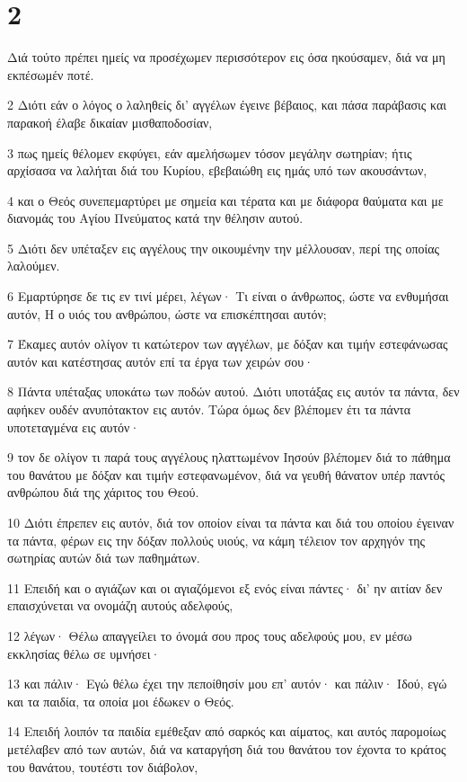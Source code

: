\chapter{2}

\par Διά τούτο πρέπει ημείς να προσέχωμεν περισσότερον εις όσα ηκούσαμεν, διά να μη εκπέσωμέν ποτέ.
\par 2 Διότι εάν ο λόγος ο λαληθείς δι' αγγέλων έγεινε βέβαιος, και πάσα παράβασις και παρακοή έλαβε δικαίαν μισθαποδοσίαν,
\par 3 πως ημείς θέλομεν εκφύγει, εάν αμελήσωμεν τόσον μεγάλην σωτηρίαν; ήτις αρχίσασα να λαλήται διά του Κυρίου, εβεβαιώθη εις ημάς υπό των ακουσάντων,
\par 4 και ο Θεός συνεπεμαρτύρει με σημεία και τέρατα και με διάφορα θαύματα και με διανομάς του Αγίου Πνεύματος κατά την θέλησιν αυτού.
\par 5 Διότι δεν υπέταξεν εις αγγέλους την οικουμένην την μέλλουσαν, περί της οποίας λαλούμεν.
\par 6 Εμαρτύρησε δε τις εν τινί μέρει, λέγων· Τι είναι ο άνθρωπος, ώστε να ενθυμήσαι αυτόν, Η ο υιός του ανθρώπου, ώστε να επισκέπτησαι αυτόν;
\par 7 Έκαμες αυτόν ολίγον τι κατώτερον των αγγέλων, με δόξαν και τιμήν εστεφάνωσας αυτόν και κατέστησας αυτόν επί τα έργα των χειρών σου·
\par 8 Πάντα υπέταξας υποκάτω των ποδών αυτού. Διότι υποτάξας εις αυτόν τα πάντα, δεν αφήκεν ουδέν ανυπότακτον εις αυτόν. Τώρα όμως δεν βλέπομεν έτι τα πάντα υποτεταγμένα εις αυτόν·
\par 9 τον δε ολίγον τι παρά τους αγγέλους ηλαττωμένον Ιησούν βλέπομεν διά το πάθημα του θανάτου με δόξαν και τιμήν εστεφανωμένον, διά να γευθή θάνατον υπέρ παντός ανθρώπου διά της χάριτος του Θεού.
\par 10 Διότι έπρεπεν εις αυτόν, διά τον οποίον είναι τα πάντα και διά του οποίου έγειναν τα πάντα, φέρων εις την δόξαν πολλούς υιούς, να κάμη τέλειον τον αρχηγόν της σωτηρίας αυτών διά των παθημάτων.
\par 11 Επειδή και ο αγιάζων και οι αγιαζόμενοι εξ ενός είναι πάντες· δι' ην αιτίαν δεν επαισχύνεται να ονομάζη αυτούς αδελφούς,
\par 12 λέγων· Θέλω απαγγείλει το όνομά σου προς τους αδελφούς μου, εν μέσω εκκλησίας θέλω σε υμνήσει·
\par 13 και πάλιν· Εγώ θέλω έχει την πεποίθησίν μου επ' αυτόν· και πάλιν· Ιδού, εγώ και τα παιδία, τα οποία μοι έδωκεν ο Θεός.
\par 14 Επειδή λοιπόν τα παιδία εμέθεξαν από σαρκός και αίματος, και αυτός παρομοίως μετέλαβεν από των αυτών, διά να καταργήση διά του θανάτου τον έχοντα το κράτος του θανάτου, τουτέστι τον διάβολον,
